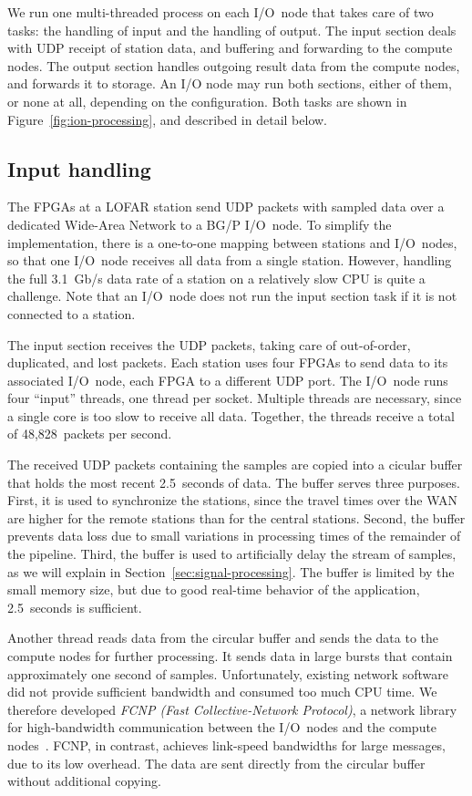 \documentclass{sig-alternate}
\begin{document}
We run one multi-threaded process on each I/O~node that takes care of two
tasks: the handling of input and the handling of output.
The input section deals with UDP receipt of station data, and buffering and forwarding to the compute nodes.
The output section handles outgoing result data from the compute nodes, and forwards it to storage.
An I/O node may run both sections, either of them, or none at all, depending
on the configuration.
Both tasks are shown in Figure~\ref{fig:ion-processing}, and described in detail below.


\subsection{Input handling}
\label{sec:input-handling}

The FPGAs at a LOFAR station send UDP packets with sampled data over a
dedicated Wide-Area Network to a BG/P I/O~node.
To simplify the implementation, there is a one-to-one mapping between
stations and I/O~nodes, so that one I/O~node receives all data from a single
station.
However, handling the full 3.1~Gb/s data rate of a station on a relatively
slow CPU is quite a challenge.
Note that an I/O~node does not run the input section task if it is not
connected to a station.

The input section receives the UDP packets, taking care of out-of-order,
duplicated, and lost packets.
Each station uses four FPGAs to send data to its associated I/O~node,
each FPGA to a different UDP port.
The I/O~node runs four ``input'' threads, one thread per socket.
Multiple threads are necessary, since a single core is too slow to receive all
data.
Together, the threads receive a total of 48,828~packets per second.

The received UDP packets containing the samples are copied into a cicular buffer that holds the most recent
2.5~seconds of data.
The buffer serves three purposes.
First, it is used to synchronize the stations, since the travel times over
the WAN are higher for the remote stations than for the central stations.
Second, the buffer prevents data loss due to small variations in processing
times of the remainder of the pipeline.
Third, the buffer is used to artificially delay the stream of samples,
as we will explain in Section~\ref{sec:signal-processing}.
The buffer is limited by the small memory size, but due to good real-time
behavior of the application, 2.5~seconds is sufficient.

Another thread reads data from the circular buffer and sends the data to
the compute nodes for further processing.
It sends data in large bursts that contain approximately one second of samples.
Unfortunately, existing network software did not provide sufficient bandwidth
and consumed too much CPU time.
We therefore developed \emph{FCNP (Fast Collective-Network Protocol)}, a 
network library for high-bandwidth communication between the I/O~nodes and the
compute nodes~\cite{Romein:09a}.
FCNP, in contrast, achieves link-speed bandwidths for large messages, due to
its low overhead.
The data are sent directly from the circular buffer without additional copying.
\end{document}
